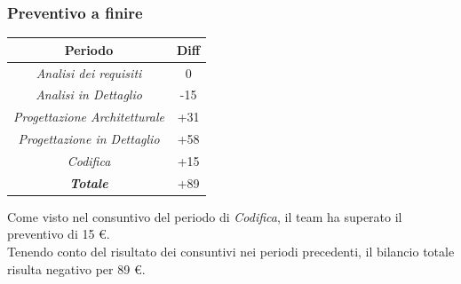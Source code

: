 \begin{frame}
	\frametitle{Preventivo a finire}
	
	\begin{center}
		\centering
		\begin{tabular}{|c|c|}
			\hline
			\textbf{Periodo} & \textbf{Diff} \\
			\hline
			\emph{Analisi dei requisiti}  & 0 \\
			\hline  \emph{Analisi in Dettaglio}  & -15 \\
			\hline  \emph{Progettazione Architetturale}  & +31 \\
			\hline  \emph{Progettazione in Dettaglio}  & +58 \\
			\hline  \emph{Codifica}  & +15 \\
			\hline  \emph{\textbf{Totale}}  & +89 \\
			\hline
		\end{tabular}
	\end{center}
	
	
Come visto nel consuntivo del periodo di \textit{Codifica}, il team ha superato il preventivo di 15 \euro.\\
Tenendo conto del risultato dei consuntivi nei periodi precedenti, il bilancio totale risulta negativo per 89 \euro.\\

\end{frame}

